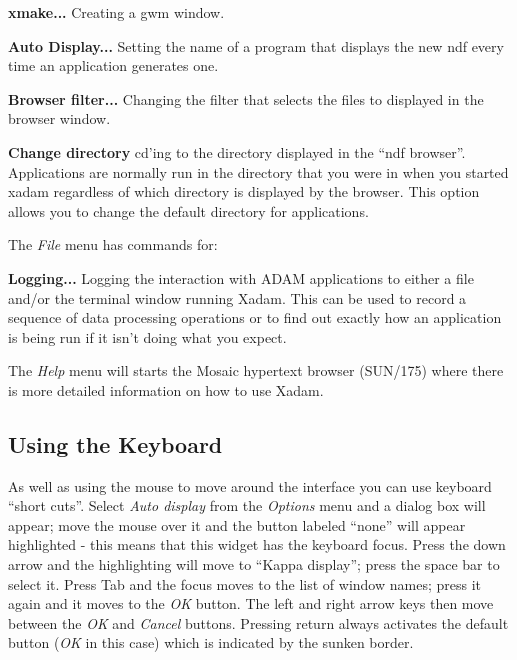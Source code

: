 \begin{list}{}{\setlength{\rightmargin}{\leftmargin}}
\item[\bf xmake...] Creating a gwm window.

\item[\bf Auto Display...] Setting the name of a program that displays
the new ndf every time an application generates one.

\item[\bf Browser filter...] Changing the filter that selects the files
to displayed in the browser window.

\item[\bf Change directory] cd'ing to the directory displayed in the
``ndf browser''. Applications are normally run in the directory that
you were in when you started xadam regardless of which directory is
displayed by the browser. This option allows you to change the default
directory for applications.

\end{list}

The {\em File} menu has commands for:

\begin{list}{}{\setlength{\rightmargin}{\leftmargin}}

\item[\bf Logging...] Logging the interaction with ADAM applications to
either a file and/or the terminal window running Xadam. This can be
used to record a sequence of data processing operations or to find out
exactly how an application is being run if it isn't doing what you
expect.

\end{list}

The {\em Help} menu will starts the Mosaic hypertext browser (SUN/175)
where there is more detailed information on how to use Xadam.

\subsection{Using the Keyboard}

As well as using the mouse to move around the interface you can use
keyboard ``short cuts''. Select {\em Auto display} from the {\em
Options} menu and a dialog box will appear; move the mouse over it and
the button labeled ``none'' will appear highlighted - this means that
this widget has the keyboard focus. Press the down arrow and the
highlighting will move to ``Kappa display''; press the space bar to
select it. Press Tab and the focus moves to the list of window names;
press it again and it moves to the {\em OK} button. The left and right
arrow keys then move between the {\em OK} and {\em Cancel} buttons.
Pressing return always activates the default button ({\em OK} in this
case) which is indicated by the sunken border.

